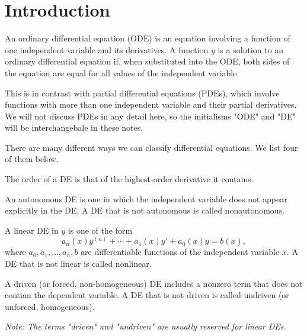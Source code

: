 \documentclass[../m82main.tex]{subfiles}
\begin{document}
\chapter{Introduction}

\begin{definition}
    An ordinary differential equation (ODE) is an equation involving a function of one independent variable and its derivatives.
    A function $y$ is a solution to an ordinary differential equation if, when substituted into the ODE, both sides of the equation are equal for all values of the independent variable.
\end{definition}

This is in contrast with partial differential equations (PDEs), which involve functions with more than one independent variable and their partial derivatives.
We will not discuss PDEs in any detail here, so the initialisms "ODE" and "DE" will be interchangebale in these notes.

There are many different ways we can classify differential equations.
We list four of them below.

\begin{definition}
    The order of a DE is that of the highest-order derivative it contains.
\end{definition}

\begin{definition}
    An autonomous DE is one in which the independent variable does not appear explicitly in the DE.
    A DE that is not autonomous is called nonautonomous.
\end{definition}

\begin{definition}
    A linear DE in $y$ is one of the form
    \[ a_n(x)y^{(n)} + \cdots + a_1(x)y' + a_0(x)y = b(x), \]
    where $a_0, a_1, \ldots, a_n, b$ are differentiable functions of the independent variable $x$.
    A DE that is not linear is called nonlinear.
\end{definition}

\begin{definition}
    A driven (or forced, non-homogeneous) DE includes a nonzero term that does not contian the dependent variable.
    A DE that is not driven is called undriven (or unforced, homogeneous).

    \medskip
    \textit{Note: The terms "driven" and "undriven" are usually reserved for linear DEs.}
\end{definition}
\end{document}
